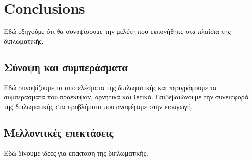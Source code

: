 \chapter{Conclusions}
\label{chap_last}

Εδώ εξηγούμε ότι θα συνοψίσουμε την μελέτη που εκπονήθηκε στα πλαίσια της διπλωματικής.

\section{Σύνοψη και συμπεράσματα}

Εδώ συνοψίζουμε τα αποτελέσματα της διπλωματικής και περιγράφουμε τα συμπεράσματα που προέκυψαν, αρνητικά και θετικά. Επιβεβαιώνουμε την συνεισφορά της διπλωματικής στα προβλήματα που αναφέραμε στην εισαγωγή.

\section{Μελλοντικές επεκτάσεις}

Εδώ δίνουμε ιδέες για επέκταση της διπλωματικής.
